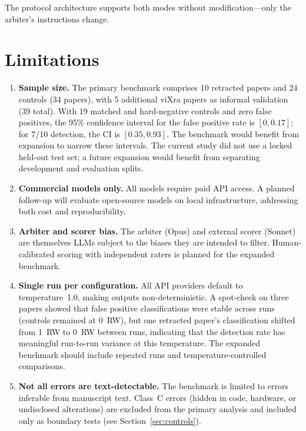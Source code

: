 \documentclass[11pt]{article}
\begin{document}
The protocol architecture supports both modes without modification---only the arbiter's instructions change.

\section{Limitations}

\begin{enumerate}
\item \textbf{Sample size.} The primary benchmark comprises 10 retracted papers and 24 controls (34 papers), with 5 additional viXra papers as informal validation (39 total). With 19 matched and hard-negative controls and zero false positives, the 95\% confidence interval for the false positive rate is $[0, 0.17]$; for 7/10 detection, the CI is $[0.35, 0.93]$. The benchmark would benefit from expansion to narrow these intervals. The current study did not use a locked held-out test set; a future expansion would benefit from separating development and evaluation splits.

\item \textbf{Commercial models only.} All models require paid API access. A planned follow-up will evaluate open-source models on local infrastructure, addressing both cost and reproducibility.

\item \textbf{Arbiter and scorer bias.} The arbiter (Opus) and external scorer (Sonnet) are themselves LLMs subject to the biases they are intended to filter. Human-calibrated scoring with independent raters is planned for the expanded benchmark.

\item \textbf{Single run per configuration.} All API providers default to temperature~1.0, making outputs non-deterministic. A spot-check on three papers showed that false positive classifications were stable across runs (controls remained at 0~RW), but one retracted paper's classification shifted from 1~RW to 0~RW between runs, indicating that the detection rate has meaningful run-to-run variance at this temperature. The expanded benchmark should include repeated runs and temperature-controlled comparisons.

\item \textbf{Not all errors are text-detectable.} The benchmark is limited to errors inferable from manuscript text. Class~C errors (hidden in code, hardware, or undisclosed alterations) are excluded from the primary analysis and included only as boundary tests (see Section~\ref{sec:controls}).


\end{enumerate}
\end{document}
